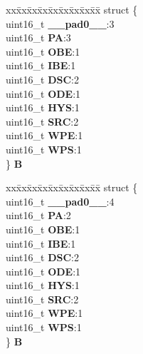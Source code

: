 \begin{DoxyCompactItemize}
\begin{tabbing}
\end{tabbing}\item 
\mbox{\label{unionSIU__tag_1_1SIU__PCR__tag_a508200a4be227f5898d1f5249b5bc5ef}} 
\begin{tabbing}
xx\=xx\=xx\=xx\=xx\=xx\=xx\=xx\=xx\=\kill
struct \{\\
\>uint16\_t {\bfseries \_\_pad0\_\_}:3\\
\>uint16\_t {\bfseries PA}:3\\
\>uint16\_t {\bfseries OBE}:1\\
\>uint16\_t {\bfseries IBE}:1\\
\>uint16\_t {\bfseries DSC}:2\\
\>uint16\_t {\bfseries ODE}:1\\
\>uint16\_t {\bfseries HYS}:1\\
\>uint16\_t {\bfseries SRC}:2\\
\>uint16\_t {\bfseries WPE}:1\\
\>uint16\_t {\bfseries WPS}:1\\
\} {\bfseries B}\\

\end{tabbing}\item 
\mbox{\label{unionSIU__tag_1_1SIU__PCR__tag_ac3f86eb15fc5cd500de5a2a2eb062fe8}} 
\begin{tabbing}
xx\=xx\=xx\=xx\=xx\=xx\=xx\=xx\=xx\=\kill
struct \{\\
\>uint16\_t {\bfseries \_\_pad0\_\_}:4\\
\>uint16\_t {\bfseries PA}:2\\
\>uint16\_t {\bfseries OBE}:1\\
\>uint16\_t {\bfseries IBE}:1\\
\>uint16\_t {\bfseries DSC}:2\\
\>uint16\_t {\bfseries ODE}:1\\
\>uint16\_t {\bfseries HYS}:1\\
\>uint16\_t {\bfseries SRC}:2\\
\>uint16\_t {\bfseries WPE}:1\\
\>uint16\_t {\bfseries WPS}:1\\
\} {\bfseries B}\\


\end{tabbing}
\end{DoxyCompactItemize}

